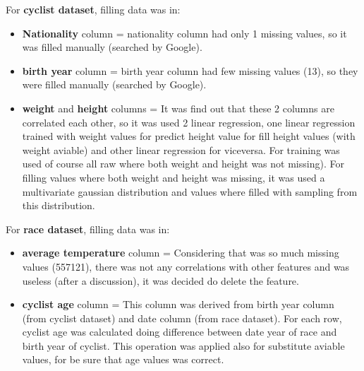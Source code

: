 \documentclass[a4paper, twoside]{article}
\begin{document}
For \textbf{cyclist dataset}, filling data was in:

\begin{itemize}[noitemsep]

    \item \textbf{Nationality} column = nationality column had only 1 missing values, so it was filled manually (searched by Google).

    \item \textbf{birth year} column = birth year column had few missing values (13), so they were filled manually (searched by Google).

    \item \textbf{weight} and \textbf{height} columns = It was find out that these 2 columns are correlated each other, so it was used 2 linear regression, one linear regression trained with weight values for predict height value for fill height values (with weight aviable) and other linear regression for viceversa. For training was used of course all raw where both weight and height was not missing). For filling values where both weight and height was missing, it was used a multivariate gaussian distribution and values where filled with sampling from this distribution.

\end{itemize}

For \textbf{race dataset}, filling data was in:

\begin{itemize}[noitemsep]

    \item \textbf{average temperature} column = Considering that was so much missing values (557121), there was not any correlations with other features and was useless (after a discussion), it was decided do delete the feature.

    \item \textbf{cyclist age} column = This column was derived from birth year column (from cyclist dataset) and date column (from race dataset). For each row, cyclist age was calculated doing difference between date year of race and birth year of cyclist. This operation was applied also for substitute aviable values, for be sure that age values was correct.

\end{itemize}
\end{document}
